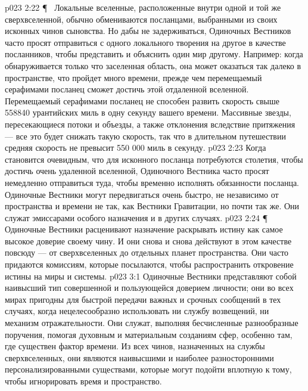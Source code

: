\vs p023 2:22 \P\ \bibnobreakspace {} Локальные вселенные, расположенные внутри одной и той же сверхвселенной, обычно обмениваются посланцами, выбранными из своих исконных чинов сыновства. Но дабы не задерживаться, Одиночных Вестников часто просят отправиться с одного локального творения на другое в качестве посланников, чтобы представить и объяснить один мир другому. Например: когда обнаруживается только что заселенная область, она может оказаться так далеко в пространстве, что пройдет много времени, прежде чем перемещаемый серафимами посланец сможет достичь этой отдаленной вселенной. Перемещаемый серафимами посланец не способен развить скорость свыше 558840 урантийских миль в одну секунду вашего времени. Массивные звезды, пересекающиеся потоки и объезды, а также отклонения вследствие притяжения --- все это будет снижать такую скорость, так что в длительном путешествии средняя скорость не превысит 550 000 миль в секунду.
\vs p023 2:23 Когда становится очевидным, что для исконного посланца потребуются столетия, чтобы достичь очень удаленной вселенной, Одиночного Вестника часто просят немедленно отправиться туда, чтобы временно исполнять обязанности посланца. Одиночные Вестники могут передвигаться очень быстро, не независимо от пространства и времени не так, как Вестники Гравитации, но почти так же. Они служат эмиссарами особого назначения и в других случаях.
\vs p023 2:24 \P\ \bibnobreakspace {} Одиночные Вестники расценивают назначение раскрывать истину как самое высокое доверие своему чину. И они снова и снова действуют в этом качестве повсюду --- от сверхвселенных до отдельных планет пространства. Они часто придаются комиссиям, которые посылаются, чтобы распространить откровение истины на миры и системы.
\vs p023 3:1 Одиночные Вестники представляют собой наивысший тип совершенной и пользующейся доверием личности; они во всех мирах пригодны для быстрой передачи важных и срочных сообщений в тех случаях, когда нецелесообразно использовать ни службу возвещений, ни механизм отражательности. Они служат, выполняя бесчисленные разнообразные поручения, помогая духовным и материальным созданиям сфер, особенно там, где существен фактор времени. Из всех чинов, назначенных на службы сверхвселенных, они являются наивысшими и наиболее разносторонними персонализированными существами, которые могут подойти вплотную к тому, чтобы игнорировать время и пространство.
